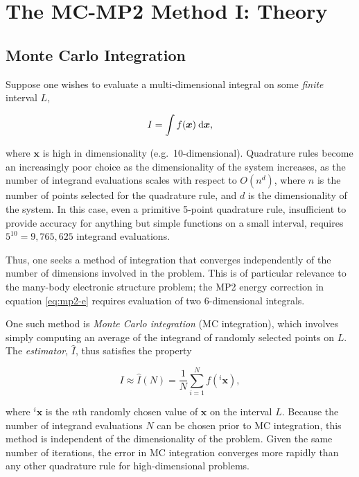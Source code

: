 \chapter{The MC-MP2 Method I: Theory}

\section{Monte Carlo Integration}
\label{s:mc-int}

Suppose one wishes to evaluate a multi-dimensional integral on some
\emph{finite} interval $L$,

\begin{equation}
I = \int f(\bm x) \:\mathrm{d} \bm x,
\label{eq:mc-int}
\end{equation}

\noindent where $\bm x$ is high in dimensionality (e.g.\ 10-dimensional).
Quadrature rules become an increasingly poor choice as the dimensionality of the
system increases, as the number of integrand evaluations scales with respect to
$O(n^d)$, where $n$ is the number of points selected for the quadrature rule,
and $d$ is the dimensionality of the system. In this case, even a primitive
5-point quadrature rule, insufficient to provide accuracy for anything but
simple functions on a small interval, requires $5^{10} = 9,765,625$ integrand
evaluations.

Thus, one seeks a method of integration that converges independently of the
number of dimensions involved in the problem. This is of particular relevance to
the many-body electronic structure problem; the MP2 energy correction in
equation \ref{eq:mp2-e} requires evaluation of two 6-dimensional integrals.

One such method is \emph{Monte Carlo integration} (MC integration), which
involves simply computing an average of the integrand of randomly selected
points on $L$. The \emph{estimator}, $\hat I$, thus satisfies the property

\begin{equation}
	I \approx \hat I(N) = \frac{1}{N} \sum_{i = 1}^N f(^i \bm x),
\end{equation}

\noindent where $^i \bm x$ is the $n$th randomly chosen value of $\bm x$ on the
interval $L$. Because the number of integrand evaluations $N$ can be chosen
prior to MC integration, this method is independent of the dimensionality of the
problem.  Given the same number of iterations, the error in MC integration
converges more rapidly than any other quadrature rule for high-dimensional
problems.

